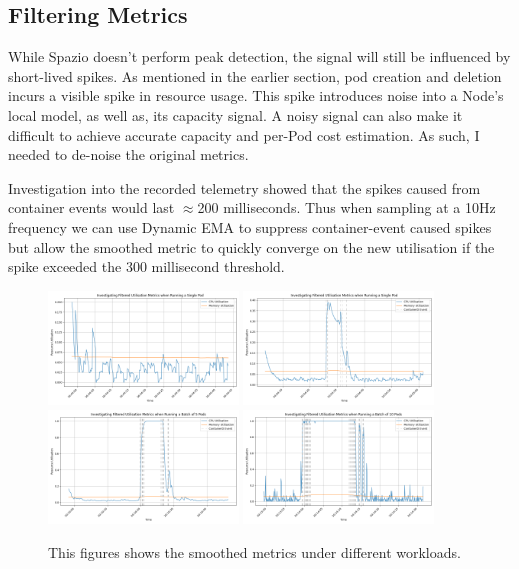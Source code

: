 \subsection{Filtering Metrics}
While Spazio doesn't perform peak detection, the signal will still be influenced
by short-lived spikes. As mentioned in the earlier section, pod creation and
deletion incurs a visible spike in resource usage. This spike introduces noise
into a Node's local model, as well as, its capacity signal. A noisy signal can
also make it difficult to achieve accurate capacity and per-Pod cost estimation.
As such, I needed to de-noise the original metrics.

Investigation into the recorded telemetry showed that the spikes caused from
container events would last $\approx$200 milliseconds. Thus when sampling at a
10Hz frequency we can use Dynamic EMA to suppress container-event caused spikes
but allow the smoothed metric to quickly converge on the new utilisation if the
spike exceeded the 300 millisecond threshold.

\begin{figure}[H]
    \centering
    \includegraphics[width=0.45\textwidth]{images/filter-utilisation-baseline.png}
    \includegraphics[width=0.45\textwidth]{images/filter-utilisation-single.png} \\
    \includegraphics[width=0.45\textwidth]{images/filter-utilisation-smallbatch.png}
    \includegraphics[width=0.45\textwidth]{images/filter-utilisation-bigbatch.png}
    \caption{This figures shows the smoothed metrics under different workloads.}
    \label{fig:filtered-metrics-eval}
\end{figure}

